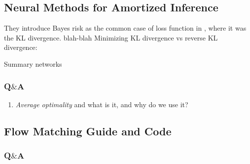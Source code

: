 \subsection{Neural Methods for Amortized Inference \cite{zammitmangion2024neuralmethodsamortizedinference}}
They introduce Bayes risk as the common case of loss function in \cite{radev2020bayesflowlearningcomplexstochastic}, where it was the KL divergence. 
blah-blah
Minimizing KL divergence vs reverse KL divergence:

Summary networks  

\subsubsection*{Q$\&$A}

\begin{enumerate}
    \item \textit{Average optimality} and what is it, and why do we use it? 
\end{enumerate}



\subsection{Flow Matching Guide and Code \cite{lipman2024flowmatchingguidecode}}

\subsubsection*{Q$\&$A}

